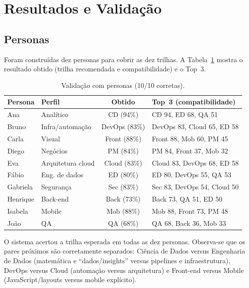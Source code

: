 \documentclass[12pt,a4paper]{article}
\begin{document}
\section{Resultados e Valida\c{c}\~ao}

\subsection{Personas}

Foram constru\'idas dez personas para cobrir as dez trilhas. A
Tabela~\ref{tab:personas} mostra o resultado obtido (trilha recomendada e
compatibilidade) e o Top~3.

\begin{table}[htbp]
\centering
\caption{Valida\c{c}\~ao com personas (10/10 corretas).}
\label{tab:personas}
\footnotesize
\setlength{\tabcolsep}{3pt}
\begin{tabular}{@{}llcl@{}}
\toprule
Persona & Perfil & Obtido & Top~3 (compatibilidade) \\
\midrule
Ana      & Anal\'itico        & CD (94\%)    & CD 94, ED 68, QA 51 \\
Bruno    & Infra/automa\c{c}\~ao & DevOps (83\%) & DevOps 83, Cloud 65, ED 58 \\
Carla    & Visual             & Front (88\%) & Front 88, Mob 60, PM 45 \\
Diego    & Neg\'ocios         & PM (84\%)    & PM 84, Front 37, Mob 32 \\
Eva      & Arquitetura cloud  & Cloud (83\%) & Cloud 83, DevOps 68, ED 58 \\
F\'abio  & Eng. de dados      & ED (80\%)    & ED 80, DevOps 55, QA 53 \\
Gabriela & Seguran\c{c}a      & Sec (83\%)   & Sec 83, DevOps 54, Cloud 50 \\
Henrique & Back-end           & Back (73\%)  & Back 73, QA 51, ED 50 \\
Isabela  & Mobile             & Mob (88\%)   & Mob 88, Front 73, PM 48 \\
Jo\~ao   & QA                 & QA (68\%)    & QA 68, Back 36, Mob 33 \\
\bottomrule
\end{tabular}
\end{table}

O sistema acertou a trilha esperada em todas as dez personas. Observa-se que os
pares pr\'oximos s\~ao corretamente separados: Ci\^encia de Dados versus Engenharia
de Dados (matem\'atica e ``dados/insights'' versus pipelines e infraestrutura),
DevOps versus Cloud (automa\c{c}\~ao versus arquitetura) e Front-end versus Mobile
(JavaScript/layouts versus mobile expl\'icito).
\end{document}
